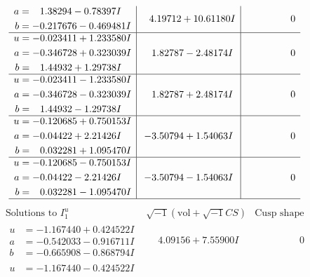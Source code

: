 \documentclass[1p]{elsarticle_modified}
\theoremstyle{definition}
\newcommand{\I}{\sqrt{-1}}
\begin{document}
$$\begin{array}{c|c|c}
\begin{aligned}
a &= \phantom{-}1.38294 - 0.78397 I \\
b &= -0.217676 - 0.469481 I\end{aligned}
 & \phantom{-}4.19712 + 10.61180 I & \phantom{-0.000000 } 0 \\ \hline\begin{aligned}
u &= -0.023411 + 1.233580 I \\
a &= -0.346728 + 0.323039 I \\
b &= \phantom{-}1.44932 + 1.29738 I\end{aligned}
 & \phantom{-}1.82787 - 2.48174 I & \phantom{-0.000000 } 0 \\ \hline\begin{aligned}
u &= -0.023411 - 1.233580 I \\
a &= -0.346728 - 0.323039 I \\
b &= \phantom{-}1.44932 - 1.29738 I\end{aligned}
 & \phantom{-}1.82787 + 2.48174 I & \phantom{-0.000000 } 0 \\ \hline\begin{aligned}
u &= -0.120685 + 0.750153 I \\
a &= -0.04422 + 2.21426 I \\
b &= \phantom{-}0.032281 + 1.095470 I\end{aligned}
 & -3.50794 + 1.54063 I & \phantom{-0.000000 } 0 \\ \hline\begin{aligned}
u &= -0.120685 - 0.750153 I \\
a &= -0.04422 - 2.21426 I \\
b &= \phantom{-}0.032281 - 1.095470 I\end{aligned}
 & -3.50794 - 1.54063 I & \phantom{-0.000000 } 0\\
 \hline 
 \end{array}$$\newpage$$\begin{array}{c|c|c}  
\text{Solutions to }I^u_{1}& \I (\text{vol} + \sqrt{-1}CS) & \text{Cusp shape}\\
 \hline 
\begin{aligned}
u &= -1.167440 + 0.424522 I \\
a &= -0.542033 - 0.916711 I \\
b &= -0.665908 - 0.868794 I\end{aligned}
 & \phantom{-}4.09156 + 7.55900 I & \phantom{-0.000000 } 0 \\ \hline\begin{aligned}
u &= -1.167440 - 0.424522 I \\

\end{aligned}
\end{array}$$
\end{document}
